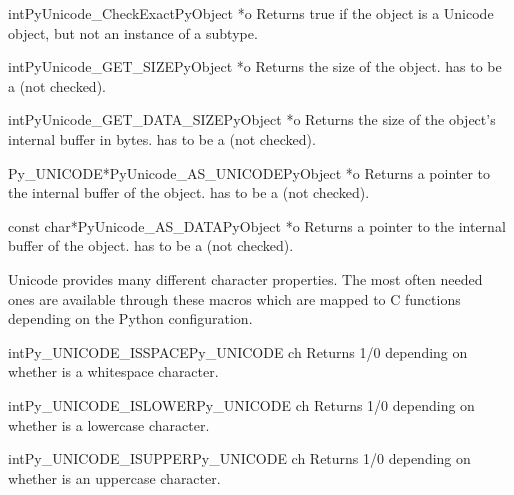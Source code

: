 \begin{cfuncdesc}{int}{PyUnicode_CheckExact}{PyObject *o}
  Returns true if the object  is a Unicode object, but not an
  instance of a subtype.
\end{cfuncdesc}

\begin{cfuncdesc}{int}{PyUnicode_GET_SIZE}{PyObject *o}
  Returns the size of the object.   has to be a
   (not checked).
\end{cfuncdesc}

\begin{cfuncdesc}{int}{PyUnicode_GET_DATA_SIZE}{PyObject *o}
  Returns the size of the object's internal buffer in bytes.  
  has to be a  (not checked).
\end{cfuncdesc}

\begin{cfuncdesc}{Py_UNICODE*}{PyUnicode_AS_UNICODE}{PyObject *o}
  Returns a pointer to the internal  buffer of the
  object.   has to be a  (not checked).
\end{cfuncdesc}

\begin{cfuncdesc}{const char*}{PyUnicode_AS_DATA}{PyObject *o}
  Returns a pointer to the internal buffer of the object.
   has to be a  (not checked).
\end{cfuncdesc}


Unicode provides many different character properties. The most often
needed ones are available through these macros which are mapped to C
functions depending on the Python configuration.

\begin{cfuncdesc}{int}{Py_UNICODE_ISSPACE}{Py_UNICODE ch}
  Returns 1/0 depending on whether  is a whitespace
  character.
\end{cfuncdesc}

\begin{cfuncdesc}{int}{Py_UNICODE_ISLOWER}{Py_UNICODE ch}
  Returns 1/0 depending on whether  is a lowercase character.
\end{cfuncdesc}

\begin{cfuncdesc}{int}{Py_UNICODE_ISUPPER}{Py_UNICODE ch}
  Returns 1/0 depending on whether  is an uppercase
  character.
\end{cfuncdesc}

